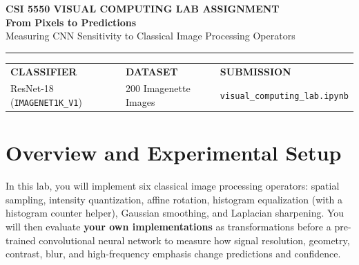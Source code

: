 \documentclass[11pt,letterpaper]{article}
\newcommand{\code}[1]{\texttt{\textcolor{primary}{#1}}}
\begin{document}
\begin{tcolorbox}[
    enhanced,
    colback=bannerbg,
    colframe=accent!35,
    borderline west={4pt}{0pt}{primary},
    arc=3pt,
    boxrule=0.5pt,
    left=12pt,
    right=12pt,
    top=8pt,
    bottom=8pt,
    before skip=0pt,
    after skip=0.45em
  ]
  {\small\bfseries\color{accent} CSI 5550 \enspace\textperiodcentered\enspace VISUAL COMPUTING \enspace\textperiodcentered\enspace LAB ASSIGNMENT}\\[0.25em]
  {\fontsize{19}{22}\selectfont\bfseries\color{primary} From Pixels to Predictions}\\[0.15em]
  {\normalsize\color{muted} Measuring CNN Sensitivity to Classical Image Processing Operators}\\[0.35em]
  {\color{accent!30}\hrule height 0.5pt}\vspace{0.35em}
  {\renewcommand{\arraystretch}{1.08}%
    \begin{tabular*}{\linewidth}{@{\extracolsep{\fill}}lll@{}}
      {\scriptsize\bfseries\color{accent} CLASSIFIER} &
      {\scriptsize\bfseries\color{accent} DATASET} &
      {\scriptsize\bfseries\color{accent} SUBMISSION} \\
      {\footnotesize ResNet-18 (\code{IMAGENET1K\_V1})} &
      {\footnotesize 200 Imagenette Images} &
      {\footnotesize\code{visual\_computing\_lab.ipynb}}
    \end{tabular*}}
\end{tcolorbox}

\section{Overview and Experimental Setup}

In this lab, you will implement six classical image processing operators: spatial sampling, intensity quantization, affine rotation, histogram equalization (with a histogram counter helper), Gaussian smoothing, and Laplacian sharpening. You will then evaluate \textbf{your own implementations} as transformations before a pre-trained convolutional neural network to measure how signal resolution, geometry, contrast, blur, and high-frequency emphasis change predictions and confidence.
\end{document}
